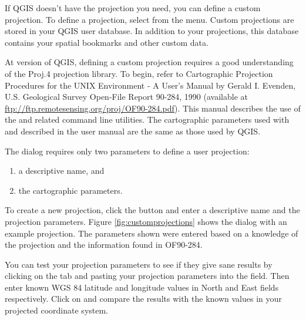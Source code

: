 If QGIS doesn't have the projection you need, you can define a custom
projection. To define a projection, select  from
the  menu. Custom projections are stored in your QGIS user
database. In addition to your projections, this database contains your spatial
bookmarks and other custom data. 


At version \CURRENT of QGIS, defining a custom projection requires a good
understanding of the Proj.4 projection library. To begin, refer to
Cartographic Projection Procedures for the UNIX Environment - A User's Manual
by Gerald I. Evenden, U.S. Geological Survey Open-File Report 90-284, 1990
(available at \url{ftp://ftp.remotesensing.org/proj/OF90-284.pdf}).
This manual describes the use of the  and related command line
utilities. The cartographic parameters used with  and described
in the user manual are the same as those used by QGIS. 

The  dialog requires only two parameters to define a user
projection: 
\begin{enumerate}
\item a descriptive name, and
\item the cartographic parameters. 
\end{enumerate}
To create a new projection, click the  button and enter a descriptive
name and the projection parameters. Figure \ref{fig:customprojections} shows
the dialog with an example projection. The parameters shown were entered based
on a knowledge of the projection and the information found in OF90-284.

You can test your projection parameters to see if they give sane results by
clicking on the  tab and pasting your projection parameters into
the  field. Then enter known WGS 84 latitude and longitude
values in North and East fields respectively. Click on  and
compare the results with the known values in your projected coordinate
system. 

